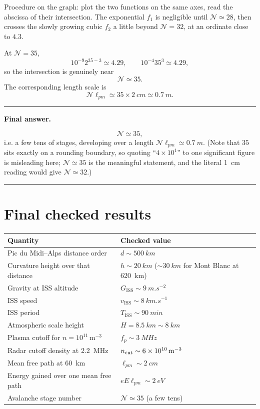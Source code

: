 \documentclass[11pt,a4paper]{article}
\newenvironment{finalanswer}{%
  \begin{center}\begin{minipage}{0.94\linewidth}\hrule\vspace{0.45em}\textbf{Final answer. }%
}{%
  \vspace{0.45em}\hrule\end{minipage}\end{center}%
}
\newcommand{\ISS}{\mathrm{ISS}}
\begin{document}
Procedure on the graph: plot the two functions on the same axes, read the abscissa
of their intersection. The exponential $f_1$ is negligible until
$\mathcal{N}\simeq28$, then crosses the slowly growing cubic $f_2$ a little beyond
$\mathcal{N}=32$, at an ordinate close to $4.3$.

At \(\mathcal{N}=35\),
\[
10^{-9}2^{35-3}\simeq4.29,
\qquad
10^{-4}35^3\simeq4.29,
\]
so the intersection is genuinely near
\[
 \mathcal{N}\simeq35.
\]
The corresponding length scale is
\[
 \mathcal{N}\ell_{pm}\simeq35\times\SI{2}{cm}\simeq\SI{0.7}{m}.
\]

\begin{finalanswer}
\[
\mathcal{N}\simeq35,
\]
i.e. a few tens of stages, developing over a length
$\mathcal{N}\ell_{pm}\simeq\SI{0.7}{m}$. (Note that $35$ sits exactly on a
rounding boundary, so quoting ``$4\times10^1$'' to one significant figure is
misleading here; $\mathcal{N}\simeq35$ is the meaningful statement, and the
literal \SI{1}{cm} reading would give $\mathcal{N}\simeq32$.)
\end{finalanswer}

\section*{Final checked results}

\begin{center}
\begin{tabular}{@{}ll@{}}
\toprule
Quantity & Checked value \\
\midrule
Pic du Midi--Alps distance order & $d\sim\SI{500}{km}$ \\
Curvature height over that distance & $h\sim\SI{20}{km}$ ($\sim\SI{30}{km}$ for Mont Blanc at \SI{620}{km}) \\
Gravity at ISS altitude & $G_{\ISS}\sim\SI{9}{m.s^{-2}}$ \\
ISS speed & $v_{\ISS}\sim\SI{8}{km.s^{-1}}$ \\
ISS period & $T_{\ISS}\sim\SI{90}{min}$ \\
Atmospheric scale height & $H=\SI{8.5}{km}\sim\SI{8}{km}$ \\
Plasma cutoff for $n=10^{11}\,\mathrm{m^{-3}}$ & $f_p\sim\SI{3}{MHz}$ \\
Radar cutoff density at \SI{2.2}{MHz} & $n_{\rm cut}\sim\SI{6e10}{m^{-3}}$ \\
Mean free path at \SI{60}{km} & $\ell_{pm}\sim\SI{2}{cm}$ \\
Energy gained over one mean free path & $eE\ell_{pm}\sim\SI{2}{eV}$ \\
Avalanche stage number & $\mathcal{N}\simeq35$ (a few tens) \\
\bottomrule
\end{tabular}
\end{center}
\end{document}

